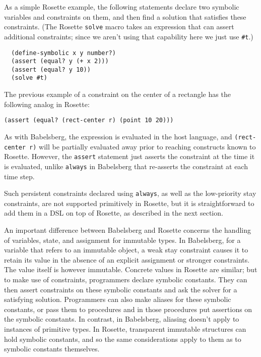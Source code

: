 \documentclass[reprint]{sigplanconf}
\begin{document}
As a simple Rosette example, the following statements declare two
symbolic variables and constraints on them, and then find a solution
that satisfies these constraints.  (The Rosette \verb|solve| macro
takes an expression that can assert additional constraints; since we
aren't using that capability here we just use \verb|#t|.)

\begin{verbatim}
  (define-symbolic x y number?)
  (assert (equal? y (+ x 2)))
  (assert (equal? y 10))
  (solve #t)
\end{verbatim}

The previous example of a constraint on the center of a rectangle has
the following analog in Rosette:

\begin{verbatim}
(assert (equal? (rect-center r) (point 10 20)))
\end{verbatim}

As with Babelsberg, the expression is evaluated in the host language, and
\verb|(rect-center r)| will be partially evaluated away prior to reaching
constructs known to Rosette.  
However, the \verb|assert| statement just asserts the constraint at the
time it is evaluated, unlike \verb|always| in Babelsberg that re-asserts
the constraint at each time step.

Such persistent constraints declared using \verb|always|, as well as
the low-priority stay constraints, are not supported primitively in
Rosette, but it is straightforward to add them in a DSL on top of
Rosette, as described in the next section.

An important difference between Babelsberg and Rosette concerns the
handling of variables, state, and assignment for immutable types.  In
Babelsberg, for a variable that refers to an immutable object, a weak stay
constraint causes it to retain its value in the absence of an explicit
assignment or stronger constraints.  The value itself is however immutable.
Concrete values in Rosette are similar; but to make use of constraints,
programmers declare symbolic constants.  They can then assert constraints
on these symbolic constants and ask the solver for a satisfying solution.
Programmers can also make aliases for these symbolic constants, or pass
them to procedures and in those procedures put assertions on the symbolic
constants.  In contrast, in Babelsberg, aliasing doesn't apply to instances
of primitive types.  In Rosette, transparent immutable structures can hold
symbolic constants, and so the same considerations apply to them as to
symbolic constants themselves.  
\end{document}

